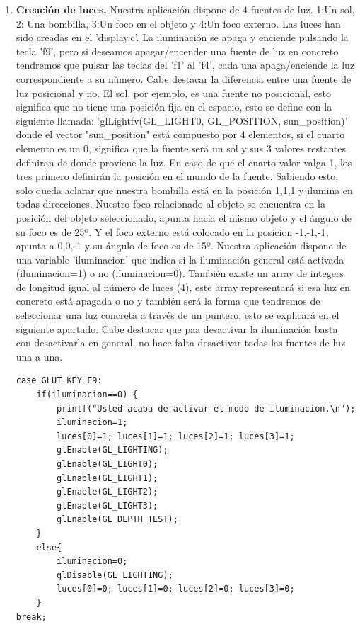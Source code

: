 \documentclass[12pt,a4paper]{article}
\begin{document}
\begin{enumerate}
\begin{enumerate}
\item \textbf{Creación de luces.}
Nuestra aplicación dispone de 4 fuentes de luz. 1:Un sol, 2: Una bombilla, 3:Un foco en el objeto y 4:Un foco externo. Las luces han sido creadas en el 'display.c'. La iluminación se apaga y enciende pulsando la tecla 'f9', pero si deseamos apagar/encender una fuente de luz en concreto tendremos que pulsar las teclas del 'f1' al 'f4', cada una apaga/enciende la luz correspondiente a su número.\newline
Cabe destacar la diferencia entre una fuente de luz posicional y no. El sol, por ejemplo, es una fuente no posicional, esto significa que no tiene una posición fija en el espacio, esto se define con la siguiente llamada: 'glLightfv(GL\_LIGHT0, GL\_POSITION, sun\_position)' donde el vector "sun\_position" está compuesto por 4 elementos, si el cuarto elemento es un 0, significa que la fuente será un sol y sus 3 valores restantes definiran de donde proviene la luz. En caso de que el cuarto valor valga 1, los tres primero definirán la posición en el mundo de la fuente.\newline
Sabiendo esto, solo queda aclarar que nuestra bombilla está en la posición {1,1,1} y ilumina en todas direcciones. Nuestro foco relacionado al objeto se encuentra en la posición del objeto seleccionado, apunta hacia el mismo objeto y el ángulo de su foco es de 25º. Y el foco externo está colocado en la posicion {-1,-1,-1}, apunta a {0,0,-1} y su ángulo de foco es de 15º.\newline
Nuestra aplicación dispone de una variable 'iluminacion' que indica si la iluminación general está activada (iluminacion=1) o no (iluminacion=0). También existe un array de integers de longitud igual al número de luces (4), este array representará si esa luz en concreto está apagada o no y también será la forma que tendremos de seleccionar una luz concreta a través de un puntero, esto se explicará en el siguiente apartado.\newline
Cabe destacar que paa desactivar la iluminación basta con desactivarla en general, no hace falta desactivar todas las fuentes de luz una a una.
\begin{lstlisting}
case GLUT_KEY_F9:
    if(iluminacion==0) {
        printf("Usted acaba de activar el modo de iluminacion.\n");
        iluminacion=1;
        luces[0]=1; luces[1]=1; luces[2]=1; luces[3]=1;
        glEnable(GL_LIGHTING);
        glEnable(GL_LIGHT0);
        glEnable(GL_LIGHT1);
        glEnable(GL_LIGHT2);
        glEnable(GL_LIGHT3);
        glEnable(GL_DEPTH_TEST);
    }
    else{
        iluminacion=0;
        glDisable(GL_LIGHTING);
        luces[0]=0; luces[1]=0; luces[2]=0; luces[3]=0;
    }
break;


\end{lstlisting}
\end{enumerate}
\end{enumerate}
\end{document}
